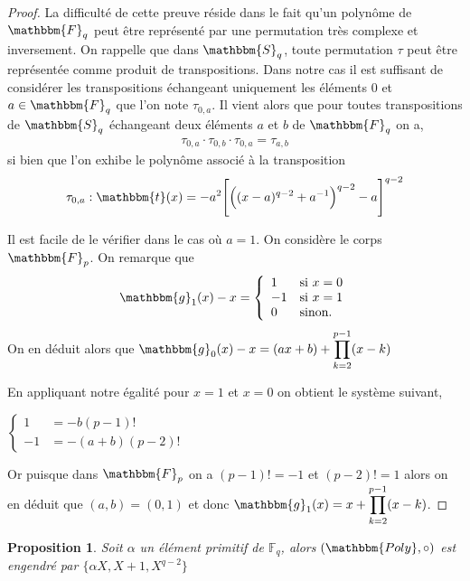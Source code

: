 \documentclass[12pt]{article}
\newcommand{\Fq}{\mathds{F}_q}
\newtheorem{prop}{Proposition}
\theoremstyle{definition}
\begin{document}
\begin{proof}
La difficulté de cette preuve réside dans le fait qu'un polynôme de $\mathbbm{F}_q$ peut être représenté par une permutation très complexe et inversement. On rappelle que dans $\mathbbm{S}_q$, toute permutation $\tau$ peut être représentée comme produit de transpositions. Dans notre cas il est suffisant de considérer les transpositions échangeant uniquement les éléments $0$ et $a \in \mathbbm{F}_q$ que l'on note $\tau_{0,a}$. Il vient alors que pour toutes transpositions de $\mathbbm{S}_q$ échangeant deux éléments $a$ et $b$ de $\mathbbm{F}_q$ on a,
\begin{align*}
\tau_{0,a} \cdot \tau_{0,b} \cdot \tau_{0,a} = \tau_{a,b}
\end{align*}
si bien que l'on exhibe le polynôme associé à la transposition
\begin{align*}
\tau_{0,a} : \mathbbm{t} (x) = -a^2 \Bigg [ \Big ((x-a)^{q-2} + a^{-1} \Big )^{q-2} - a \Bigg ]^{q-2}
\end{align*}

Il est facile de le vérifier dans le cas où $a = 1$. On considère le corps $\mathbbm{F}_p$. On remarque que 
	$$
\mathbbm{g}_1 (x) - x = \left\{
    \begin{array}{ll}
        1 & \mbox{si } x = 0 \\
       -1 & \mbox{si } x = 1 \\
       0 & \mbox{sinon.}
    \end{array}
\right.
$$
On en déduit alors que $\displaystyle \mathbbm{g}_0  (x)- x = (ax + b) +  \prod_{k=2}^{p-1} (x-k)$

En appliquant notre égalité pour $x=1$ et $x=0$ on obtient le système suivant,
\begin{center}
$
\left\{
    \begin{array}{ll}
    	1 &= -b(p-1)!\\
    	-1 &= -(a+b)(p-2)!
    \end{array}
\right.
$
\end{center}
Or puisque dans $\mathbbm{F}_p$ on a $(p-1)! = -1$ et $(p-2)! = 1$ alors on en déduit que $(a,b) = (0,1)$ et donc $\displaystyle \mathbbm{g}_1 (x) = x +  \prod_{k=2}^{p-1} (x-k)$.
\end{proof}

\begin{prop}
Soit $\alpha$ un élément primitif de $\Fq$, alors $(\mathbbm{Poly}, \circ)$ est engendré par $\{ \alpha X, X+1, X^{q-2}\}$
\end{prop}
\end{document}
